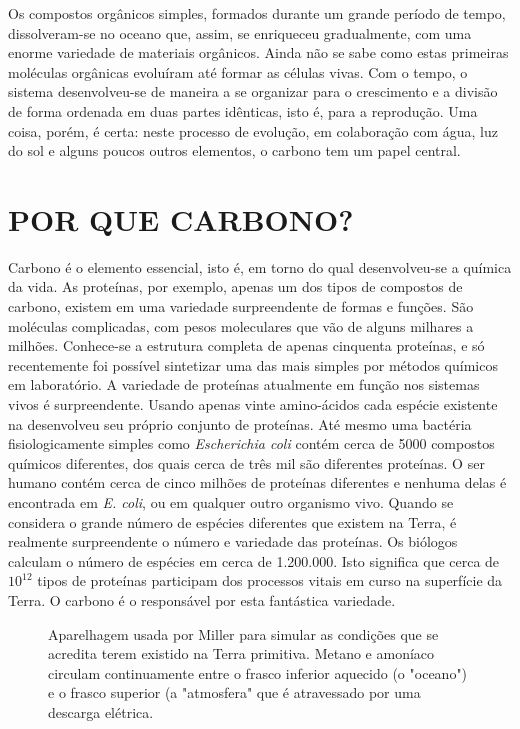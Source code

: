 Os compostos orgânicos simples, formados durante um grande período de tempo, dissolveram-se no oceano que, assim, se enriqueceu gradualmente, com uma enorme variedade de materiais orgânicos. Ainda não se sabe como estas primeiras moléculas orgânicas evoluíram até formar as células vivas. Com o tempo, o sistema desenvolveu-se de maneira a se organizar para o crescimento e a divisão de forma ordenada em duas partes idênticas, isto é, para a reprodução. Uma coisa, porém, é certa: neste processo de evolução, em colaboração com água, luz do sol e alguns poucos outros elementos, o carbono tem um papel central. 

\section{POR QUE CARBONO?}

Carbono é o elemento essencial, isto é, em torno do qual desenvolveu-se a química da vida. As proteínas, por exemplo, apenas um dos tipos de compostos de carbono, existem em uma variedade surpreendente de formas e funções. São moléculas complicadas, com pesos moleculares que vão de alguns milhares a milhões. Conhece-se a estrutura completa de apenas cinquenta proteínas, e só recentemente foi possível sintetizar uma das mais simples por métodos químicos em laboratório. A variedade de proteínas atualmente em função nos sistemas vivos é surpreendente. Usando apenas vinte amino-ácidos cada espécie existente na desenvolveu seu próprio conjunto de proteínas. Até mesmo uma bactéria fisiologicamente simples como \textit{Escherichia coli} contém cerca de 5000 compostos químicos diferentes, dos quais cerca de três mil são diferentes proteínas. O ser humano contém cerca de cinco milhões de proteínas diferentes e nenhuma delas é encontrada em \textit{E. coli}, ou em qualquer outro organismo vivo. Quando se considera o grande número de espécies diferentes que existem na Terra, é realmente surpreendente o número e variedade das proteínas. Os biólogos calculam o número de espécies em cerca de 1.200.000. Isto significa que cerca de $10^{12}$ tipos de proteínas participam dos processos vitais em curso na superfície da Terra. O carbono é o responsável por esta fantástica variedade. 

\begin{figure}[htbp]
    \centering
    \caption{Aparelhagem usada por Miller para simular as condições que se acredita terem existido na Terra primitiva. Metano e amoníaco circulam continuamente entre o frasco inferior aquecido (o "oceano") e o frasco superior (a "atmosfera" que é atravessado por uma descarga elétrica.}
    \label{fig1_1}
\end{figure}

